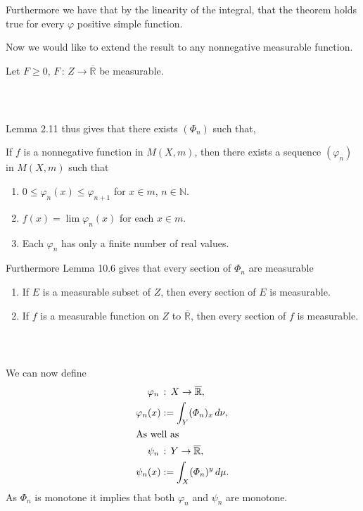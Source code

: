 \documentclass{beamer}
\numberwithin{equation}{section}
\begin{document}
\begin{frame}\frametitle{{\normalsize \secname} \\ {\large \subsecname}}
    Furthermore we have that by the linearity of the integral, that the theorem holds true for every $\varphi$ positive simple function.
    \vspace{1em}

    Now we would like to extend the result to any nonnegative measurable function.
    \vspace{1em}

    Let $F \geq 0, \, F \, : \, Z \rightarrow \overline{\mathbb{R}}$ be measurable. 
\end{frame}

\begin{frame}\frametitle{{\normalsize \secname} \\ {\large \subsecname}}
    Lemma 2.11 thus gives that there exists $(\varPhi_n)$ such that,
    \begingroup
    \small
    \begin{lemma}[2.11]
        If $f$ is a nonnegative function in $M(X,m)$, then there exists a sequence $(\varphi_n)$ in $M(X,m)$ such that
        \begin{enumerate}
            \item $0 \leq \varphi_n(x) \leq \varphi_{n + 1}$ for $x \in m$, $n \in \mathbb{N}$.
            \item $f(x) = \lim \varphi_n(x)$ for each $x \in m$.
            \item Each $\varphi_n$ has only a finite number of real values.
        \end{enumerate}
    \end{lemma}
    \endgroup
    Furthermore Lemma 10.6 gives that every section of $\varPhi_n$ are measurable
    \begingroup
    \small
    \begin{lemma}[10.6]
        \begin{enumerate}
            \item If $E$ is a measurable subset of $Z$, then every section of $E$ is measurable.
            \item If $f$ is a measurable function on $Z$ to $\overline{\mathbb{R}}$, then every section of $f$ is measurable.
        \end{enumerate}
    \end{lemma}
    \endgroup
\end{frame}

\begin{frame}\frametitle{{\normalsize \secname} \\ {\large \subsecname}}
    We can now define
    \begin{align}
        \varphi_n \, &: \, X \rightarrow \overline{\mathbb{R}}, \\
        \varphi_n(x) &:= \int_Y (\varPhi_n)_x \, d\nu, \\
    \intertext{As well as}
        \psi_n \, &: \, Y \rightarrow \overline{\mathbb{R}}, \\
        \psi_n(x) &:= \int_X (\varPhi_n)^y \, d\mu.
    \end{align}
    As $\varPhi_n$ is monotone it implies that both $\varphi_n$ and $\psi_n$ are monotone.
\end{frame}
\end{document}

